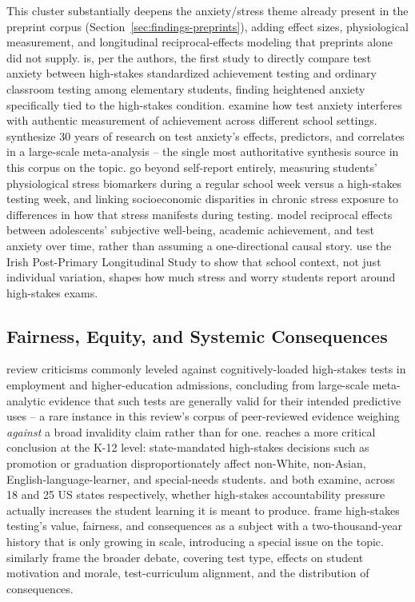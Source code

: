\documentclass[11pt]{article}
\begin{document}
This cluster substantially deepens the anxiety/stress theme already present in the preprint corpus (Section~\ref{sec:findings-preprints}), adding effect sizes, physiological measurement, and longitudinal reciprocal-effects modeling that preprints alone did not supply. \citet{segool2013anxiety} is, per the authors, the first study to directly compare test anxiety between high-stakes standardized achievement testing and ordinary classroom testing among elementary students, finding heightened anxiety specifically tied to the high-stakes condition. \citet{vonderembse2012settings} examine how test anxiety interferes with authentic measurement of achievement across different school settings. \citet{vonderembse2017metaanalysis} synthesize 30 years of research on test anxiety's effects, predictors, and correlates in a large-scale meta-analysis -- the single most authoritative synthesis source in this corpus on the topic. \citet{heissel2019physio} go beyond self-report entirely, measuring students' physiological stress biomarkers during a regular school week versus a high-stakes testing week, and linking socioeconomic disparities in chronic stress exposure to differences in how that stress manifests during testing. \citet{steinmayr2016wellbeing} model reciprocal effects between adolescents' subjective well-being, academic achievement, and test anxiety over time, rather than assuming a one-directional causal story. \citet{banks2015ireland} use the Irish Post-Primary Longitudinal Study to show that school context, not just individual variation, shapes how much stress and worry students report around high-stakes exams.

\subsection{Fairness, Equity, and Systemic Consequences}

\citet{sackett2008validity} review criticisms commonly leveled against cognitively-loaded high-stakes tests in employment and higher-education admissions, concluding from large-scale meta-analytic evidence that such tests are generally valid for their intended predictive uses -- a rare instance in this review's corpus of peer-reviewed evidence weighing \emph{against} a broad invalidity claim rather than for one. \citet{horn2003cycle} reaches a more critical conclusion at the K-12 level: state-mandated high-stakes decisions such as promotion or graduation disproportionately affect non-White, non-Asian, English-language-learner, and special-needs students. \citet{amrein2002learning} and \citet{nichols2006accountability} both examine, across 18 and 25 US states respectively, whether high-stakes accountability pressure actually increases the student learning it is meant to produce. \citet{stobart2012value} frame high-stakes testing's value, fairness, and consequences as a subject with a two-thousand-year history that is only growing in scale, introducing a special issue on the topic. \citet{sloane2003issues} similarly frame the broader debate, covering test type, effects on student motivation and morale, test-curriculum alignment, and the distribution of consequences.
\end{document}

